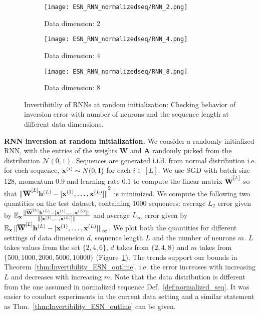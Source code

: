 \begin{figure}[!ht]
\centering
\iffalse
\texttt{[image: ../ESN\_RNN\_normalizedseq/RNN\_2.png]}
\texttt{[image: ../ESN\_RNN\_normalizedseq/RNN\_4.png]}
\texttt{[image: ../ESN\_RNN\_normalizedseq/RNN\_8.png]}
\fi
\begin{subfigure}
  \centering
  \texttt{[image: ESN\_RNN\_normalizedseq/RNN\_2.png]}
  \caption{Data dimension: 2}
\end{subfigure}
\begin{subfigure}
  \centering
  \texttt{[image: ESN\_RNN\_normalizedseq/RNN\_4.png]}
  \caption{Data dimension: 4}
\end{subfigure}%
\begin{subfigure}
  \centering
  \texttt{[image: ESN\_RNN\_normalizedseq/RNN\_8.png]}
  \caption{Data dimension: 8}
\end{subfigure}%
\caption{Invertibitiliy of RNNs at random initialization: Checking behavior of inversion error with number of neurons and the sequence length at different data dimensions.}
\label{fig:RNN_inver}
\end{figure}
\textbf{RNN inversion at random initialization.} We consider a randomly initialized RNN, with the entries of the weights $\mathbf{W}$ and $\mathbf{A}$ randomly picked from the distribution $\mathcal{N}(0, 1)$. Sequences are generated i.i.d. from normal distribution i.e. for each sequence, $\mathbf{x}^{(i)} \sim N(0, \mathbf{I})$ for each $i \in [L]$. We use SGD with batch size 128, momentum $0.9$ and learning rate $0.1$ to compute the linear matrix $\overline{\mathbf{W}}^{[L]}$ so that $\norm[0]{\overline{\mathbf{W}}^{[L]} \mathbf{h}^{(L)} - [\mathbf{x}^{(1)}, \ldots, \mathbf{x}^{(L)}]}^2$ is minimized. We compute the following two quantities on the test dataset, containing $1000$ sequences: average $L_2$ error given by $\mathbb{E}_{\mathbf{x}} \frac{\norm[0]{\overline{\mathbf{W}}^{[L]} \mathbf{h}^{(L)} - [\mathbf{x}^{(1)}, \ldots, \mathbf{x}^{(L)}]}}{\norm[0]{[\mathbf{x}^{(1)}, \ldots, \mathbf{x}^{(L)}]}}$ and average $L_\infty$ error given by $\mathbb{E}_{\mathbf{x}} \norm[0]{\overline{\mathbf{W}}^{[L]} \mathbf{h}^{(L)} - [\mathbf{x}^{(1)}, \ldots, \mathbf{x}^{(L)}]}_{\infty}$. We plot both the quantities for different settings of data dimension $d$, sequence length $L$ and the number of neurons $m$. $L$ takes values from the set $\{2, 4, 6\}$, $d$ takes from $\{2, 4, 8\}$ and $m$ takes from $\{500, 1000, 2000, 5000, 10000\}$ (Figure~\ref{fig:RNN_inver}). The trends support our bounds in Theorem~\ref{thm:Invertibility_ESN_outline}, i.e. the error increases with increasing $L$ and decreases with increasing $m$. Note that the data distribution is different from the one assumed in normalized sequence Def.~\ref{def:normalized_seq}. It was easier to conduct experiments in the current data setting and a similar statement as Thm.~\ref{thm:Invertibility_ESN_outline} can be given.




